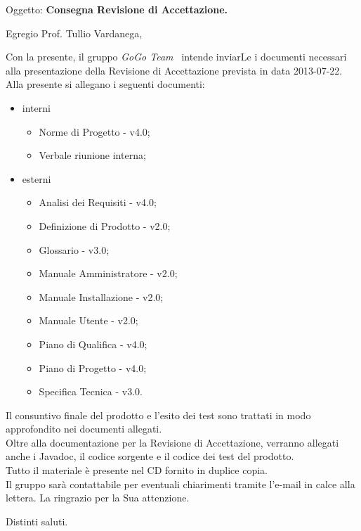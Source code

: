 \documentclass[a4paper,10pt]{letter}
\newcommand{\ggt}{GoGo Team}
\newcommand{\Vardanega}{Prof. Tullio Vardanega}
\begin{document}
	
	\begin{letter}{Oggetto: \textbf{Consegna Revisione di Accettazione.}}
	\opening {Egregio \Vardanega ,}
	Con la presente, il gruppo \textit{\ggt~} intende inviarLe i documenti necessari alla presentazione della Revisione di Accettazione prevista in data 2013-07-22.
	Alla presente si allegano i seguenti documenti:
			\begin{itemize}
				\item interni
					\begin{itemize}
						\item Norme di Progetto - v4.0;
						\item Verbale riunione interna;						
					\end{itemize}
				\item esterni
					\begin{itemize}
						\item Analisi dei Requisiti - v4.0;
						\item Definizione di Prodotto - v2.0;
						\item Glossario - v3.0;
						\item Manuale Amministratore - v2.0;
						\item Manuale Installazione - v2.0;
						\item Manuale Utente - v2.0;
						\item Piano di Qualifica - v4.0;
						\item Piano di Progetto - v4.0;
						\item Specifica Tecnica - v3.0.
					\end{itemize}
			\end{itemize} 
		
		Il consuntivo finale del prodotto e l’esito dei test sono trattati in modo approfondito nei documenti allegati.\\
		Oltre alla documentazione per la Revisione di Accettazione, verranno allegati anche i Javadoc, il codice sorgente e il codice dei test del prodotto.\\
		Tutto il materiale è presente nel CD fornito in duplice copia.\\
		Il gruppo sarà  contattabile per eventuali chiarimenti tramite l'e-mail in calce alla lettera.
		La ringrazio per la Sua attenzione.
		
\thispagestyle{fancy}
\closing{Distinti saluti.}

   \end{letter}
\end{document}
